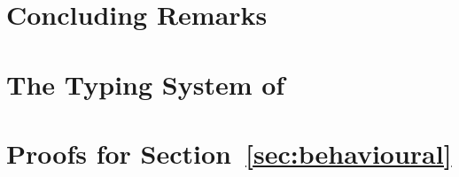 \documentclass[smallcondensed]{svjour3}
\begin{document}
\section{Concluding Remarks}
\label{sec:concl}




%
%
{}

\newpage
\appendix 
%

\section{The Typing System of \HOp}
\label{app:types}


\section{Proofs for Section~\ref{sec:behavioural}}
\label{app:beh}



\end{document}
